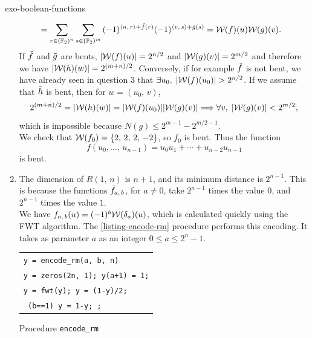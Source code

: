\begin{correction}{exo-boolean-functions}
\begin{enumerate}
\begin{align*}
& = \sum_{r \in (\mathbb{F}_2)^{n}}{\sum_{s \in (\mathbb{F}_2)^{m}}{(-1)^{\langle u,\,r\rangle + \tilde{f} (r)} (-1)^{\langle v,\,s\rangle + \tilde{g} (s)}}} = \mathcal{W} (f) (u) \mathcal{W} (g) (v ).
\end{align*}
If $ \tilde{f} $ and $ \tilde{g} $ are bents, $ | \mathcal{W} (f) (u) | = 2^{n/2} $ and $ | \mathcal{W} (g) (v) | = 2^{m/2} $ and therefore we have $ | \mathcal{W} (h) (w) | = 2^{(m + n)/2} $. Conversely, if for example $ \tilde{f} $ is not bent, we have already seen in question 3 that $ \exists u_0, \; | \mathcal{W} (f) (u_0) | > 2^{n/2} $. If we assume that $ \tilde{h} $ is bent, then for $ w = (u_0, \, v) $,
\begin{equation*}
2^{(m + n)/2} = | \mathcal{W} (h) (w) | = | \mathcal{W} (f) (u_0) | | \mathcal{W} (g) (v) | \Longrightarrow \forall v, \; | \mathcal{W} (g) (v) | <2^{m/2},
\end{equation*}
which is impossible because $ N (g) \leq 2^{m-1} - 2^{m/2-1} $. \\We check that $ \mathcal{W} (f_0) = \{2, \, 2 , \, 2, \, - 2\} $, so $ f_0 $ is bent. Thus the function
\begin{equation*}
f(u_0, \ldots, \, u_{n-1}) = u_0 u_1 + \cdots + u_{n-2} u_{n-1}
\end{equation*}
is bent.
\item The dimension of $ R (1, \, n) $ is $ n+1 $, and its minimum distance is $ 2^{n-1} $. This is because the functions $ \tilde{f}_{a, \, b} $, for $ a \neq 0 $, take $ 2^{n-1} $ times the value $ 0 $, and $ 2^{n-1} $ times the value $ 1 $. \\We have $ f_{a, \, b} (u) = (-1)^b \mathcal{W} (\delta_a) (u) $, which is calculated quickly using the FWT algorithm. The \Matlab{} \ref{listing-encode-rm} procedure performs this encoding. It takes as parameter $ a $ as an integer $ 0 \leq a \leq 2^n-1 $. 

\begin{listing} 
\begin{footnotesize}
{\upshape
\begin{tabular}{l} \texttt{\pfunction y = encode\_rm(a, b, n)} \\
\texttt{y = zeros(2{\hatverb}n, 1); y(a+1) = 1;} \\
\texttt{y = fwt(y); y = (1-y)/2;} \\
\texttt{\pif{} (b==1) y = 1-y; \pend{};} \\
\end{tabular}
}
\end{footnotesize}
\caption{Procedure \texttt{\upshape encode\_rm}}
\label{listing-encode-rm}
\end{listing}


\end{enumerate}
\end{correction}
